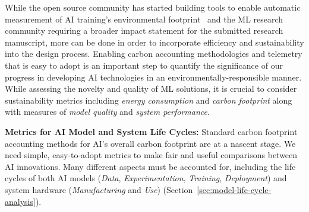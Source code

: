 While the open source community has started building tools to enable automatic measurement of AI training's environmental footprint~\cite{Lacoste:arxiv:2019,Henderson:arxiv:2020,codecarbon,Lottick:2019} and the ML research community requiring a broader impact statement for the submitted research manuscript, more can be done in order to incorporate efficiency and sustainability into the design process.
Enabling carbon accounting methodologies and telemetry that is easy to adopt is an important step to quantify the significance of our progress in developing AI technologies in an environmentally-responsible manner. While assessing the novelty and quality of ML solutions, it is crucial to consider sustainability metrics including \textit{energy consumption} and \textit{carbon footprint} along with measures of \textit{model quality} and \textit{system performance}. %

\textbf{Metrics for AI Model and System Life Cycles:} Standard carbon footprint accounting methods for AI's overall carbon footprint are at a nascent stage. We need simple, easy-to-adopt metrics to make fair and useful comparisons between AI innovations. Many different aspects must be accounted for, including the life cycles of both AI models (\textit{Data}, \textit{Experimentation}, \textit{Training}, \textit{Deployment}) and system hardware (\textit{Manufacturing} and \textit{Use}) (Section~\ref{sec:model-life-cycle-analysis}). 

